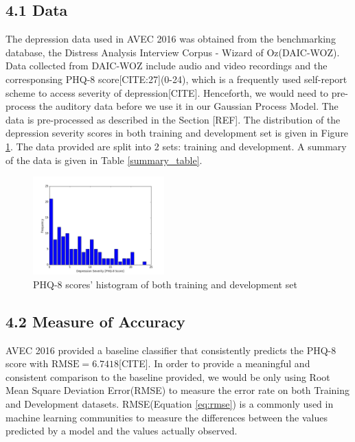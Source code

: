 \documentclass{article}
\begin{document}
	\subsection{4.1	Data}
	The depression data used in AVEC 2016 was obtained from the benchmarking database, the Distress Analysis Interview Corpus - Wizard of Oz(DAIC-WOZ). Data collected from DAIC-WOZ include audio and video recordings and the corresponsing PHQ-8 score[CITE:27](0-24), which is a frequently used self-report scheme to access severity of depression[CITE]. Henceforth, we would need to pre-process the auditory data before we use it in our Gaussian Process Model. The data is pre-processed as described in the Section [REF]. The distribution of the depression severity scores in both training and development set is given in Figure \ref{histogram_phq8}. The data provided are split into 2 sets: training and development. A summary of the data is given in Table \ref{summary_table}.
	\begin{figure}
 	\includegraphics[width=0.45\textwidth]{histogram_phq8}
	\caption{PHQ-8 scores' histogram of both training and development set}
	\label{histogram_phq8}
	\end{figure}

 	\subsection{4.2	Measure of Accuracy}
	AVEC 2016 provided a baseline classifier that consistently predicts the PHQ-8 score with $\text{RMSE}=6.7418$[CITE]. In order to provide a meaningful and consistent comparison to the baseline provided, we would be only using Root Mean Square Deviation Error(RMSE) to measure the error rate on both Training and Development datasets. RMSE(Equation \ref{eq:rmse}) is a commonly used in machine learning communities to measure the differences between the values predicted by a model and the values actually observed. 
\end{document}
